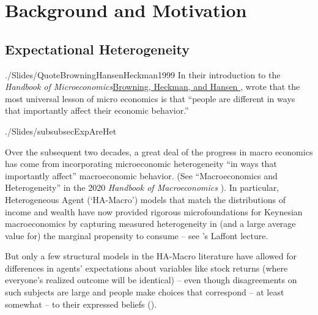 \section{Background and Motivation}\label{motivation-and-context}


\subsection{Expectational Heterogeneity}\label{EpiExpHet}\hypertarget{EpiExpHet}{}

\begin{verbatimwrite}{./Slides/QuoteBrowningHansenHeckman1999}%
    In their introduction to the \textit{Handbook of Microeconomics}\href{http://larspeterhansen.org/wp-content/uploads/2016/11/Microdata-and-GE-Models.pdf}{Browning, Heckman, and Hansen \citeyear{browning_chapter_1999}}, wrote that the most universal lesson of micro economics is that ``people are different in ways that importantly affect their economic behavior.''
\end{verbatimwrite}%
\begin{verbatimwrite}{./Slides/subsubsecExpAreHet}

\end{verbatimwrite}
    Over the subsequent two decades, a great deal of the progress in macro economics has come from incorporating microeconomic heterogeneity ``in ways that importantly affect'' macroeconomic behavior.  (See ``Macroeconomics and Heterogeneity'' in the 2020 \textit{Handbook of Macroeconomics} \cite{kmpHandbook}).  In particular, Heterogeneous Agent  (`HA-Macro') models that match the distributions of income and wealth
    have now provided rigorous microfoundations for Keynesian macroeconomics by capturing measured heterogeneity in (and a large average value for) the marginal propensity to consume -- see \cite{violante_marginal_2021}'s Laffont lecture.

    But only a few structural models in the HA-Macro literature have allowed for differences in agents' expectations about variables like stock returns (where everyone's realized outcome will be identical) -- even though disagreements on such subjects are large and people make choices that correspond -- at least somewhat --  to their expressed beliefs (\cite{gmsuBeliefs}).

